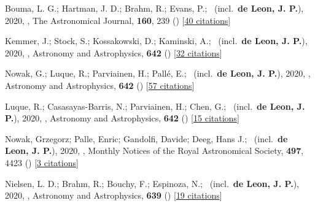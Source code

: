 \item[{\color{numcolor}\scriptsize30}] Bouma, L. G.; Hartman, J. D.; Brahm, R.; Evans, P.; \etal\ (incl.\ \textbf{de Leon, J. P.}), 2020, , The Astronomical Journal, \textbf{160}, 239 () [\href{https://ui.adsabs.harvard.edu/abs/2020AJ....160..239B}{40 citations}]

\item[{\color{numcolor}\scriptsize29}] Kemmer, J.; Stock, S.; Kossakowski, D.; Kaminski, A.; \etal\ (incl.\ \textbf{de Leon, J. P.}), 2020, , Astronomy and Astrophysics, \textbf{642} () [\href{https://ui.adsabs.harvard.edu/abs/2020A&A...642A.236K}{32 citations}]

\item[{\color{numcolor}\scriptsize28}] Nowak, G.; Luque, R.; Parviainen, H.; Pall{\'e}, E.; \etal\ (incl.\ \textbf{de Leon, J. P.}), 2020, , Astronomy and Astrophysics, \textbf{642} () [\href{https://ui.adsabs.harvard.edu/abs/2020A&A...642A.173N}{57 citations}]

\item[{\color{numcolor}\scriptsize27}] Luque, R.; Casasayas-Barris, N.; Parviainen, H.; Chen, G.; \etal\ (incl.\ \textbf{de Leon, J. P.}), 2020, , Astronomy and Astrophysics, \textbf{642} () [\href{https://ui.adsabs.harvard.edu/abs/2020A&A...642A..50L}{15 citations}]

\item[{\color{numcolor}\scriptsize26}] Nowak, Grzegorz; Palle, Enric; Gandolfi, Davide; Deeg, Hans J.; \etal\ (incl.\ \textbf{de Leon, J. P.}), 2020, , Monthly Notices of the Royal Astronomical Society, \textbf{497}, 4423 () [\href{https://ui.adsabs.harvard.edu/abs/2020MNRAS.497.4423N}{3 citations}]

\item[{\color{numcolor}\scriptsize25}] Nielsen, L. D.; Brahm, R.; Bouchy, F.; Espinoza, N.; \etal\ (incl.\ \textbf{de Leon, J. P.}), 2020, , Astronomy and Astrophysics, \textbf{639} () [\href{https://ui.adsabs.harvard.edu/abs/2020A&A...639A..76N}{19 citations}]

